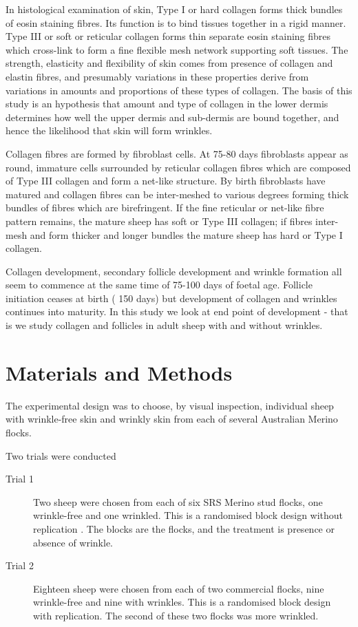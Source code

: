 \documentclass[]{interact}
\theoremstyle{plain}%
\theoremstyle{definition}
\theoremstyle{remark}
\begin{document}
 In histological examination of skin, Type I or hard collagen forms thick bundles of eosin staining fibres. Its function is to bind tissues together in a rigid manner. Type III or soft or reticular collagen forms thin separate eosin staining fibres which cross-link to form a fine flexible mesh network supporting soft tissues. The strength, elasticity and flexibility of skin comes from presence of collagen and elastin fibres, and presumably variations in these properties derive from variations in amounts and proportions of these types of collagen. The basis of this study is an hypothesis that amount and type of collagen in the lower dermis determines how well the upper dermis and sub-dermis are bound together, and hence the likelihood that skin will form wrinkles.

 Collagen fibres are formed by fibroblast cells.  At 75-80 days fibroblasts appear as round, immature cells \citep{knight-1993} surrounded by reticular collagen fibres which are composed of Type III collagen and form a net-like structure. By birth fibroblasts have matured  and collagen fibres can be inter-meshed to various degrees forming thick bundles of fibres which are birefringent. If the fine reticular  or net-like fibre pattern remains, the mature sheep has soft or Type III collagen; if fibres inter-mesh and form thicker and longer bundles the mature sheep has  hard or Type I collagen. 

Collagen development, secondary follicle development and wrinkle formation  all seem to commence at the same time of 75-100 days of foetal age.  Follicle initiation ceases at birth ( 150 days) but development of collagen and wrinkles continues into maturity. In this study we look at end point of development - that is we study collagen and follicles in adult sheep with and without wrinkles. 


\section{Materials and Methods}
\label{sec:matmeth}
The experimental design was to choose, by visual inspection, individual sheep with wrinkle-free skin and wrinkly skin from each of several Australian Merino flocks. 

Two trials were conducted
\begin{description}
\item[Trial 1]  Two sheep were chosen from each of six SRS\textsuperscript{\tiny\textregistered} Merino stud flocks, one wrinkle-free and one wrinkled. This is a randomised block design without replication .  The blocks are the flocks, and the treatment is presence or absence of wrinkle.
\item[Trial 2]  Eighteen sheep were chosen from each of two commercial flocks, nine wrinkle-free and nine with wrinkles. This is a randomised block design with replication. The second of these two flocks was more wrinkled. 
\end{description} 
\end{document}
